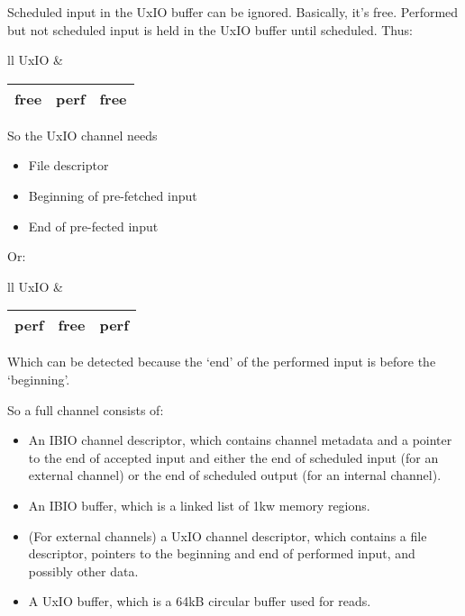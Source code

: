 \documentclass{article}
\begin{document}
Scheduled input in the UxIO buffer can be ignored.
Basically, it's free.
Performed but not scheduled input is held in the UxIO buffer until scheduled.
Thus:

\begin{tabular}{ll}
    UxIO & \begin{tabular}{|c|c|c|}
        \hline
        free & perf & free \\
        \hline
    \end{tabular}
\end{tabular}

So the UxIO channel needs
\begin{itemize}
    \item File descriptor
    \item Beginning of pre-fetched input
    \item End of pre-fected input
\end{itemize}

Or:

\begin{tabular}{ll}
    UxIO & \begin{tabular}{|c|c|c|}
        \hline
        perf & free & perf \\
        \hline
    \end{tabular}
\end{tabular}

Which can be detected because the `end' of the performed input is before the `beginning'.

So a full channel consists of:
\begin{itemize}
    \item An IBIO channel descriptor, which contains channel metadata and a pointer to the end of accepted input and either the end of scheduled input (for an external channel) or the end of scheduled output (for an internal channel).
    \item An IBIO buffer, which is a linked list of 1kw memory regions.
    \item (For external channels) a UxIO channel descriptor, which contains a file descriptor, pointers to the beginning and end of performed input, and possibly other data.
    \item A UxIO buffer, which is a 64kB circular buffer used for reads.
\end{itemize}
\end{document}
